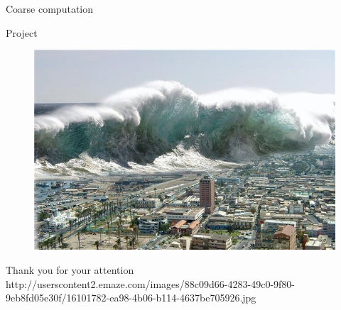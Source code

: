 \documentclass[shortpres]{beamer}
\newcommand{\imgfullscale}{0.75}
\begin{document}
\begin{frame}{Coarse computation}
\end{frame}

\begin{frame}{Project}
\end{frame}

\begin{frame}{}
	\begin{figure}
		\includegraphics[clip, width=\imgfullscale\linewidth]{img/tsunami.jpg}
	\end{figure}
	\centering
	Thank you for your attention
	\\
	\vfill
	\flushleft
	{\fontsize{5}{5} \selectfont http://userscontent2.emaze.com/images/88c09d66-4283-49c0-9f80-9eb8fd05e30f/16101782-ea98-4b06-b114-4637be705926.jpg}
\end{frame}
\end{document}
